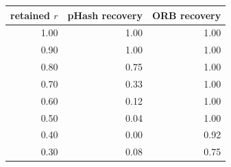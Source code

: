 \begin{tabular}{rrr}
\toprule
retained $r$ & pHash recovery & ORB recovery \\
\midrule
1.00 & 1.00 & 1.00 \\
0.90 & 1.00 & 1.00 \\
0.80 & 0.75 & 1.00 \\
0.70 & 0.33 & 1.00 \\
0.60 & 0.12 & 1.00 \\
0.50 & 0.04 & 1.00 \\
0.40 & 0.00 & 0.92 \\
0.30 & 0.08 & 0.75 \\
\bottomrule
\end{tabular}
